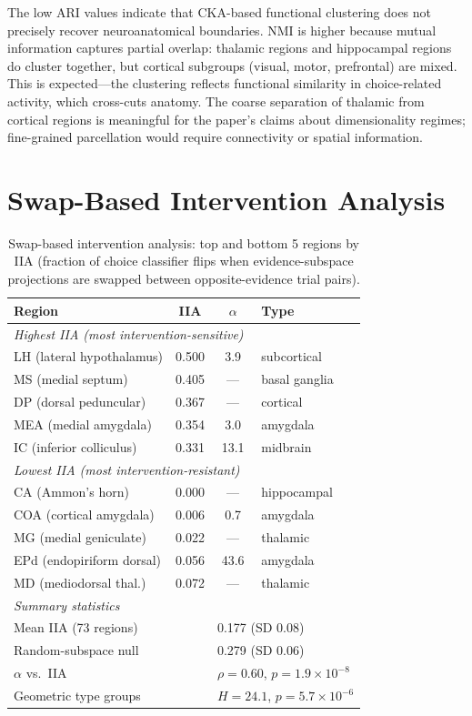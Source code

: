 \documentclass{article}
\begin{document}
The low ARI values indicate that CKA-based functional clustering does not precisely recover neuroanatomical boundaries. NMI is higher because mutual information captures partial overlap: thalamic regions and hippocampal regions do cluster together, but cortical subgroups (visual, motor, prefrontal) are mixed. This is expected---the clustering reflects functional similarity in choice-related activity, which cross-cuts anatomy. The coarse separation of thalamic from cortical regions is meaningful for the paper's claims about dimensionality regimes; fine-grained parcellation would require connectivity or spatial information.

\section{Swap-Based Intervention Analysis}
\label{app:swap_iia}

\begin{table}[h]
\centering
\small
\caption{Swap-based intervention analysis: top and bottom 5 regions by IIA (fraction of choice classifier flips when evidence-subspace projections are swapped between opposite-evidence trial pairs).}
\label{tab:swap_iia}
\begin{tabular}{@{}lccl@{}}
\toprule
\textbf{Region} & \textbf{IIA} & \textbf{$\alpha$} & \textbf{Type} \\
\midrule
\multicolumn{4}{l}{\emph{Highest IIA (most intervention-sensitive)}} \\
LH (lateral hypothalamus) & 0.500 & 3.9 & subcortical \\
MS (medial septum) & 0.405 & --- & basal ganglia \\
DP (dorsal peduncular) & 0.367 & --- & cortical \\
MEA (medial amygdala) & 0.354 & 3.0 & amygdala \\
IC (inferior colliculus) & 0.331 & 13.1 & midbrain \\
\midrule
\multicolumn{4}{l}{\emph{Lowest IIA (most intervention-resistant)}} \\
CA (Ammon's horn) & 0.000 & --- & hippocampal \\
COA (cortical amygdala) & 0.006 & 0.7 & amygdala \\
MG (medial geniculate) & 0.022 & --- & thalamic \\
EPd (endopiriform dorsal) & 0.056 & 43.6 & amygdala \\
MD (mediodorsal thal.) & 0.072 & --- & thalamic \\
\midrule
\multicolumn{4}{l}{\emph{Summary statistics}} \\
\multicolumn{2}{l}{Mean IIA (73 regions)} & \multicolumn{2}{l}{0.177 (SD 0.08)} \\
\multicolumn{2}{l}{Random-subspace null} & \multicolumn{2}{l}{0.279 (SD 0.06)} \\
\multicolumn{2}{l}{$\alpha$ vs.\ IIA} & \multicolumn{2}{l}{$\rho = 0.60$, $p = 1.9 \times 10^{-8}$} \\
\multicolumn{2}{l}{Geometric type groups} & \multicolumn{2}{l}{$H = 24.1$, $p = 5.7 \times 10^{-6}$} \\
\bottomrule
\end{tabular}
\end{table}
\end{document}
